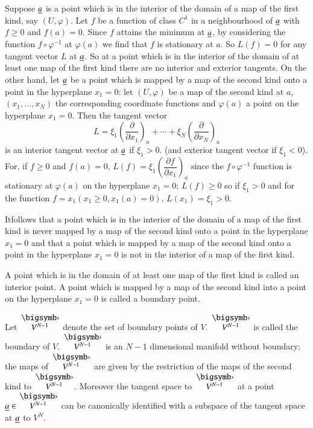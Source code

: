 Suppose $\underline{a}$ is a point which is in the interior of the domain of
a map of the first kind, say $(U,\varphi)$. Let $f$ be a function of
class $C^{1}$ in a neighbourhood of $\underline{a}$ with $f\geq 0$ and
$f(a)=0$. Since $f$ attains the minimum at $\underline{a}$, by considering
the function $f\circ \varphi^{-1}$ at $\varphi(a)$ we find that $f$ is
stationary at $a$. So $L(f)=0$ for any tangent vector $L$ at
$\underline{a}$. So at a point which is in the interior of the domain of at
least one map of the first kind there are no interior and exterior
tangents. On the other hand, let $\underline{a}$ be a point which is mapped
by a map of the second kind onto a point in the hyperplane $x_{1}=0$:
let $(U,\varphi)$ be a map of the second kind at $a$,
$(x_{1},\ldots,x_{N})$ the corresponding coordinate functions and
$\varphi(a)$ a point on the hyperplane $x_{1}=0$. Then the tangent
vector
$$
L=\xi_{1}\left(\frac{\partial}{\partial
  x_{1}}\right)_{a}+\cdots+\xi_{N}\left(\frac{\partial}{\partial
  x_{N}}\right)_{a} 
$$
is an interior tangent vector at $\underline{a}$ if $\xi_{1}>0$. (and
exterior tangent vector if $\xi_{1}<0$). For, if $f\geq 0$ and
$f(a)=0$, $L(f)=\xi_{1}\left(\dfrac{\partial f}{\partial
  x_{1}}\right)_{a}$ since the $f \circ \varphi^{-1}$ function is
stationary at $\varphi(a)$ on the hyperplane $x_{1}=0$; $L(f)\geq
0$ so if $\xi_{1}>0$ and for the function $f=x_{1}(x_{1}\geq
0,x_{1}(a)=0)$, $L(x_{1})=\xi_{1}>0$.

It\pageoriginale follows that a point which is in the interior of the
domain of a map of the first kind is never mapped by a map of the
second kind onto a point in the hyperplane $x_{1}=0$ and that a point
which is mapped by a map of the second kind onto a point in the
hyperplane $x_{1}=0$ is not in the interior of a map of the first
kind.

A point which is in the domain of at least one map of the first kind
is called an interior point. A point which is mapped by a map of the
second kind into a point on the hyperplane $x_{1}=0$ is called a
boundary point.

Let $\overset{\bigdot}{V^{N-1}}$ denote the set of boundary points of
$V$. $\overset{\bigdot}{V^{N-1}}$ is called the boundary of
$V$. $\overset{\bigdot}{V^{N-1}}$ is an $N-1$ dimensional manifold
without boundary; the maps of $\overset{\bigdot}{V^{N-1}}$ are given
by the restriction of the maps of the second kind to
$\overset{\bigdot}{V^{N-1}}$. Moreover the tangent space to
$\overset{\bigdot}{V^{N-1}}$ at a point $\ub{a}\in
\overset{\bigdot}{V^{N-1}}$ can be canonically identified with a
subspace of the tangent space at $\underline{a}$ to $V^{N}$.

